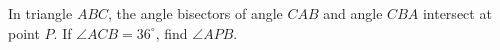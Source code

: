 In triangle $ABC$, the angle bisectors of angle $CAB$ and  angle $CBA$ intersect at point $P$. If $\angle ACB = 36^{\circ}$, find $\angle APB$.
